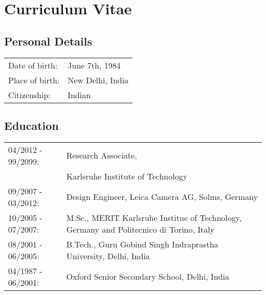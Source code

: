 \chapter*{Curriculum Vitae}

\section*{Personal Details}
\begin{tabular}[]{ll}
	Date of birth: & June 7th, 1984 \\
	Place of birth: & New Delhi, India \\
	Citizenship: & Indian
\end{tabular}

\section*{Education}

\begin{tabular}[]{lp{6.95cm}}
	
	04/2012 - 99/2099: & Research Associate, \\
										 & Karlsruhe Institute of Technology \\
	09/2007 - 03/2012: & Design Engineer, Leica Camera AG, Solms, Germany \\
	10/2005 - 07/2007: & M.Sc., MERIT Karlsruhe Institue of Technology, Germany and Politecnico di Torino, Italy \\
	08/2001 - 06/2005: & B.Tech., Guru Gobind Singh Indraprastha University, Delhi, India \\
	04/1987 - 06/2001: & Oxford Senior Secondary School, Delhi, India 	
\end{tabular}

